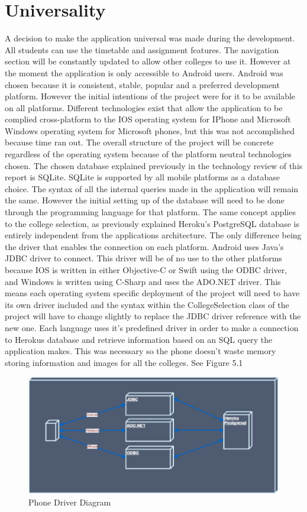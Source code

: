 \section{Universality}
A decision to make the application universal was made during the development. All students can use the timetable and assignment features. The navigation section will be constantly updated to allow other colleges to use it. However at the moment the application is only accessible to Android users. Android was chosen because it is consistent, stable, popular and a preferred development platform. However the initial intentions of the project were for it to be available on all platforms. Different technologies exist that allow the application to be complied cross-platform to the IOS operating system for IPhone and Microsoft Windows operating system for Microsoft phones, but this was not accomplished because time ran out. The overall structure of the project will be concrete regardless of the operating system because of the platform neutral technologies chosen. The chosen database explained previously in the technology review of this report is SQLite. SQLite is supported by all mobile platforms as a database choice. The syntax of all the internal queries made in the application will remain the same. However the initial setting up of the database will need to be done through the programming language for that platform. The same concept applies to the college selection, as previously explained Heroku's PostgreSQL database is entirely independent from the applications architecture. The only difference being the driver that enables the connection on each platform. Android uses Java's JDBC driver to connect. This driver will be of no use to the other platforms because IOS is written in either Objective-C or Swift using the ODBC driver, and Windows is written using C-Sharp and uses the ADO.NET driver. This means each operating system specific deployment of the project will need to have its own driver included and the syntax within the CollegeSelection class of the project will have to change slightly to replace the JDBC driver reference with the new one. Each language uses it's predefined driver in order to make a connection to Herokus database and retrieve information based on an SQL query the application makes. This was necessary so the phone doesn't waste memory storing information and images for all the colleges. See Figure 5.1

\begin{figure}[h]
	\includegraphics{img/connection-diagram.png}
	\caption{Phone Driver Diagram}
\end{figure}

